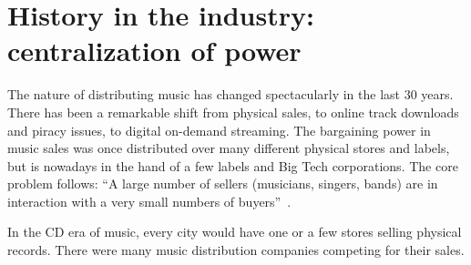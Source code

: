 


\section{History in the industry: centralization of power}
The nature of distributing music has changed spectacularly in the last 30 years. There has been a remarkable shift from physical sales, to online track downloads and piracy issues, to digital on-demand streaming. The bargaining power in music sales was once distributed over many different physical stores and labels, but is nowadays in the hand of a few labels and Big Tech corporations. The core problem follows: ``A large number of sellers (musicians, singers, bands) are in interaction with a very small numbers of buyers''~\citep{rayna2009monometapoly}.

In the CD era of music, every city would have one or a few stores selling physical records. There were many music distribution companies competing for their sales.


